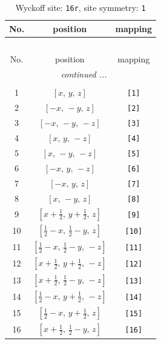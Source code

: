 \documentclass[fleqn,8pt]{jsarticle}
\begin{document}
\begin{longtable}{ccc}
\caption{Wyckoff site: {\tt 16r}, site symmetry: {\tt 1}}
 \\
 \hline \hline
No. & position & mapping \\ \hline \endfirsthead

\multicolumn{2}{l}{\tablename\ \thetable{}} \\
 \hline \hline
No. & position & mapping \\ \hline \endhead

 \hline \hline
\multicolumn{2}{r}{\footnotesize\it continued ...} \\ \endfoot

 \hline \hline
\multicolumn{2}{r}{} \\ \endlastfoot

1 & $\left[ x,\, y,\, z \right]$ & {\tt [1]} \\ \hline
2 & $\left[ - x,\, - y,\, z \right]$ & {\tt [2]} \\ \hline
3 & $\left[ - x,\, - y,\, - z \right]$ & {\tt [3]} \\ \hline
4 & $\left[ x,\, y,\, - z \right]$ & {\tt [4]} \\ \hline
5 & $\left[ x,\, - y,\, - z \right]$ & {\tt [5]} \\ \hline
6 & $\left[ - x,\, y,\, - z \right]$ & {\tt [6]} \\ \hline
7 & $\left[ - x,\, y,\, z \right]$ & {\tt [7]} \\ \hline
8 & $\left[ x,\, - y,\, z \right]$ & {\tt [8]} \\ \hline
9 & $\left[ x + \frac{1}{2},\, y + \frac{1}{2},\, z \right]$ & {\tt [9]} \\ \hline
10 & $\left[ \frac{1}{2} - x,\, \frac{1}{2} - y,\, z \right]$ & {\tt [10]} \\ \hline
11 & $\left[ \frac{1}{2} - x,\, \frac{1}{2} - y,\, - z \right]$ & {\tt [11]} \\ \hline
12 & $\left[ x + \frac{1}{2},\, y + \frac{1}{2},\, - z \right]$ & {\tt [12]} \\ \hline
13 & $\left[ x + \frac{1}{2},\, \frac{1}{2} - y,\, - z \right]$ & {\tt [13]} \\ \hline
14 & $\left[ \frac{1}{2} - x,\, y + \frac{1}{2},\, - z \right]$ & {\tt [14]} \\ \hline
15 & $\left[ \frac{1}{2} - x,\, y + \frac{1}{2},\, z \right]$ & {\tt [15]} \\ \hline
16 & $\left[ x + \frac{1}{2},\, \frac{1}{2} - y,\, z \right]$ & {\tt [16]} \\
\end{longtable}
\end{document}
